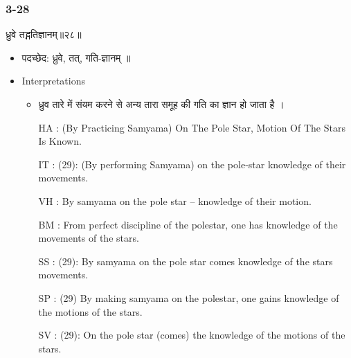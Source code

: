 \begin{frame}[fragile]\frametitle{3-28}
\begin{sanskrit}
ध्रुवे तद्गतिज्ञानम्॥२८॥
\end{sanskrit}

	\begin{itemize}
	\item पदच्छेद:   ध्रुवे, तत्, गति-ज्ञानम् ॥
	\item Interpretations
		\begin{itemize}	
		\item ध्रुव तारे में संयम करने से अन्य तारा समूह की गति का ज्ञान हो जाता है ।
		\item [HA]: (By Practicing Samyama) On The Pole Star, Motion Of The Stars Is Known.
		\item [IT]: (29): (By performing Samyama) on the pole-star knowledge of their movements.
		\item [VH]: By samyama on the pole star – knowledge of their motion.
		\item [BM]: From perfect discipline of the polestar, one has knowledge of the movements of the stars.
		\item [SS]: (29): By samyama on the pole star comes knowledge of the stars movements.
		\item [SP]: (29) By making samyama on the polestar, one gains knowledge of the motions of the stars.
		\item [SV]: (29): On the pole star (comes) the knowledge of the motions of the stars. 
		\end{itemize}
	\end{itemize}
\end{frame}


